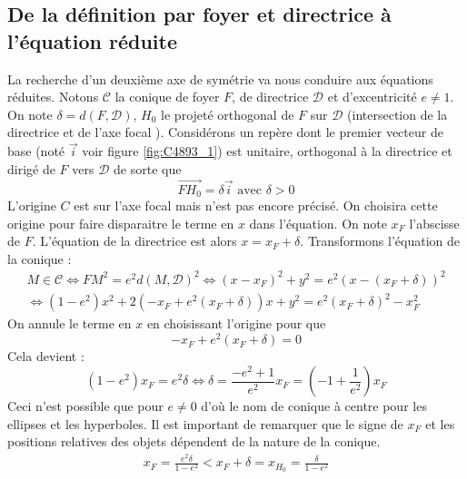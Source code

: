 \subsection{De la définition par foyer et directrice à l'équation réduite}
La recherche d'un deuxième axe de symétrie va nous conduire aux équations réduites.\newline
Notons $\mathcal C$ la conique de foyer $F$, de directrice $\mathcal D$ et d'excentricité $e\neq1$.\newline
On note $\delta=d(F,\mathcal D)$, $H_0$ le projeté orthogonal de $F$ sur $\mathcal D$ (intersection de la directrice et de l'axe focal ). Considérons un repère dont le premier vecteur de base (noté $\overrightarrow i$ voir figure \ref{fig:C4893_1}) est unitaire, orthogonal à la directrice et dirigé de $F$ vers $\mathcal D$ de sorte que
\begin{displaymath}
 \overrightarrow{FH_0}=\delta \overrightarrow i \text{ avec } \delta >0
\end{displaymath}
L'origine $C$ est sur l'axe focal mais n'est pas encore précisé. On choisira cette origine pour faire disparaitre le terme en $x$ dans l'équation. On note $x_F$ l'abscisse de $F$. L'équation de la directrice est alors $x=x_F+\delta$. Transformons l'équation de la conique :
\begin{multline*}
 M\in \mathcal C \Leftrightarrow FM^2 = e^2 d(M,\mathcal D)^2
 \Leftrightarrow (x-x_F)^2+y^2 = e^2(x-(x_F+\delta))^2 \\
\Leftrightarrow (1-e^2)x^2 +2\left( -x_F+e^2(x_F+\delta)\right)x+y^2 = e^2(x_F+\delta)^2 - x_F^2 
\end{multline*}
On annule le terme en $x$ en choisissant l'origine pour que
\begin{displaymath}
 -x_F+e^2(x_F+\delta) =0
\end{displaymath}
Cela devient :
\begin{displaymath}
 (1-e^2)x_F = e^2\delta \Leftrightarrow \delta = \dfrac{-e^2+1}{e^2}x_F =\left(-1+\dfrac{1}{e^2} \right)x_F 
\end{displaymath}
Ceci n'est possible que pour $e\neq 0$ d'où le nom de conique à centre pour les ellipses et les hyperboles. Il est important de remarquer que le signe de $x_F$ et les positions relatives des objets dépendent de la nature de la conique.
\begin{align*}
 x_F = \frac{e^2\delta}{1-e^2} <
x_F +\delta = x_{H_0} = \frac{\delta}{1-e^2}
\end{align*}
